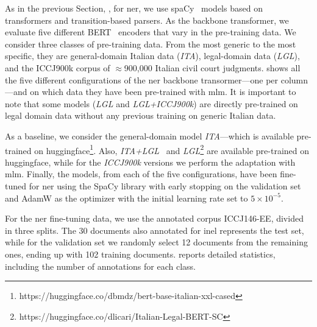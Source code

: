 


As in the previous Section, , for \ac{ner}, we use spaCy~\cite{honnibal2020spacy} models based on transformers and transition-based parsers.
As the backbone transformer, we evaluate five different BERT~\cite{devlin-etal-2019-bert} encoders that vary in the pre-training data. We consider three classes of pre-training data. From the most generic to the most specific, they are general-domain Italian data (\textit{ITA}), legal-domain data (\textit{LGL}), and the ICCJ900k corpus of $\approx$900,000 Italian civil court judgments.
 shows all the five different configurations of the \ac{ner} backbone transormer---one per column---and on which data they have been pre-trained with \acf{mlm}. It is important to note that some models (\textit{LGL} and \textit{LGL+ICCJ900k}) are directly pre-trained on legal domain data without any previous training on generic Italian data.



As a baseline, we consider the general-domain model \textit{ITA}---which is available pre-trained on huggingface\footnote{https://huggingface.co/dbmdz/bert-base-italian-xxl-cased}.
Also, \textit{ITA+LGL}~\cite{licari_italian-legal-bert_2022} and \textit{LGL}\footnote{https://huggingface.co/dlicari/Italian-Legal-BERT-SC} are available pre-trained on huggingface, while for the \textit{ICCJ900k} versions we perform the adaptation with \ac{mlm}.
Finally, the models, from each of the five configurations, have been fine-tuned for \ac{ner} using the SpaCy library with early stopping on the validation set and AdamW as the optimizer with the initial learning rate set to $5 \times 10^{-5}$.



For the \ac{ner} fine-tuning data, we use the annotated corpus ICCJ146-EE, divided in three splits. The 30 documents also annotated for \ac{inel} represents the test set, while for the validation set we randomly select 12 documents from the remaining ones, ending up with 102 training documents.  
 reports detailed statistics, including the number of annotations for each class.



